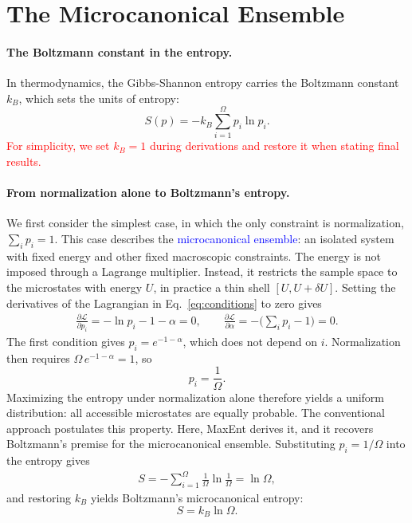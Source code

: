 \section{The Microcanonical Ensemble}

\paragraph{The Boltzmann constant in the entropy.}
In thermodynamics, the Gibbs-Shannon entropy carries the Boltzmann constant
$k_B$, which sets the units of entropy:
\begin{equation}
    \boxed{S(p) = -k_B\sum_{i=1}^{\Omega} p_i\ln p_i.}
\end{equation}
\textcolor{red}{For simplicity, we set $k_B=1$ during derivations and restore
it when stating final results.}

\paragraph{From normalization alone to Boltzmann's entropy.}
We first consider the simplest case, in which the only constraint is
normalization, $\sum_i p_i=1$. This case describes the
\textcolor{blue}{microcanonical ensemble}: an isolated system with fixed
energy and other fixed macroscopic constraints. The energy is not imposed
through a Lagrange multiplier. Instead, it restricts the sample space to the
microstates with energy $U$, in practice a thin shell $[U,U+\delta U]$.
Setting the derivatives of the Lagrangian in Eq.~\eqref{eq:conditions} to
zero gives
\begin{align*}
    \frac{\partial\mathcal{L}}{\partial p_i} = -\ln p_i-1-\alpha = 0,
    \qquad
    \frac{\partial\mathcal{L}}{\partial\alpha} = -\Big(\sum_i p_i-1\Big) = 0.
\end{align*}
The first condition gives $p_i=e^{-1-\alpha}$, which does not depend on $i$.
Normalization then requires $\Omega\, e^{-1-\alpha}=1$, so
\begin{equation}
    \boxed{p_i = \frac{1}{\Omega}.}
\end{equation}
Maximizing the entropy under normalization alone therefore yields a uniform
distribution: all accessible microstates are equally probable. The
conventional approach postulates this property. Here, MaxEnt derives it, and
it recovers Boltzmann's premise for the microcanonical ensemble. Substituting
$p_i=1/\Omega$ into the entropy gives
\begin{align*}
    S = -\sum_{i=1}^{\Omega}\frac{1}{\Omega}\ln\frac{1}{\Omega} = \ln\Omega,
\end{align*}
and restoring $k_B$ yields Boltzmann's microcanonical entropy:
\begin{equation}
    \boxed{S = k_B\ln\Omega.}
\end{equation}

